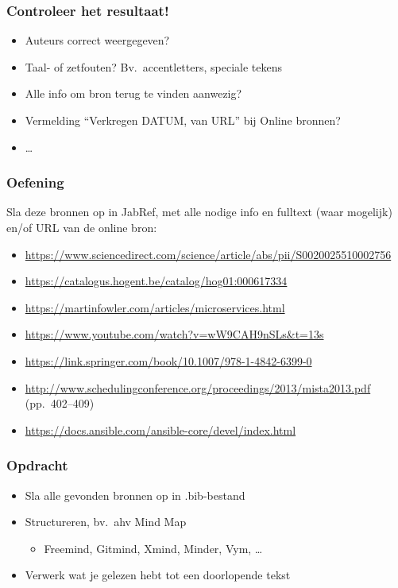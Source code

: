 \documentclass[aspectratio=169]{beamer}
\begin{document}
\begin{frame}
  \frametitle{Controleer het resultaat!}

  \begin{itemize}
    \item Auteurs correct weergegeven?
    \item Taal- of zetfouten? Bv.\ accentletters, speciale tekens
    \item Alle info om bron terug te vinden aanwezig?
    \item Vermelding ``Verkregen DATUM, van URL'' bij Online bronnen?
    \item \ldots
  \end{itemize}

\end{frame}

\begin{frame}[plain]
  \frametitle{Oefening}

  Sla deze bronnen op in JabRef, met alle nodige info en fulltext (waar mogelijk) en/of URL van de online bron:

  \bigskip

  \begin{itemize}
    \item \url{https://www.sciencedirect.com/science/article/abs/pii/S0020025510002756}
    \item \url{https://catalogus.hogent.be/catalog/hog01:000617334}
    \item \url{https://martinfowler.com/articles/microservices.html}
    \item \url{https://www.youtube.com/watch?v=wW9CAH9nSLs&t=13s}
    \item \url{https://link.springer.com/book/10.1007/978-1-4842-6399-0}
    \item \url{http://www.schedulingconference.org/proceedings/2013/mista2013.pdf} (pp.\ 402--409)
    \item \url{https://docs.ansible.com/ansible-core/devel/index.html}
  \end{itemize}

\end{frame}

\begin{frame}
  \frametitle{Opdracht}

  \begin{itemize}
    \item Sla alle gevonden bronnen op in .bib-bestand
    \item Structureren, bv.\ ahv Mind Map
      \begin{itemize}
        \item Freemind, Gitmind, Xmind, Minder, Vym, \ldots
      \end{itemize}
    \item Verwerk wat je gelezen hebt tot een doorlopende tekst
  \end{itemize}

  \bigskip

\end{frame}
\end{document}
